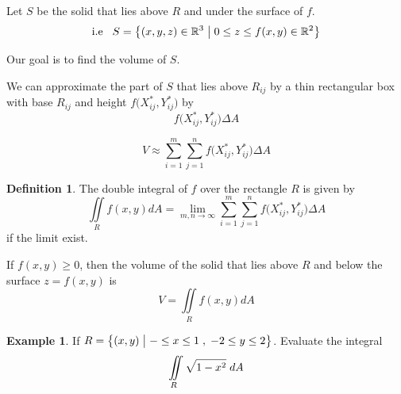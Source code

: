 \documentclass[11pt,a4paper]{article}
\theoremstyle{definition}
\newtheorem{defn}[thm]{Definition}
\newtheorem{exa}[thm]{Example}
\begin{document}
Let $S$ be the solid that lies above $R$ and under the surface of $f$.
$$\text{i.e}\hspace{0.3cm} S = \big\{(x,y,z)\in \mathbb{R}^3\hspace{0.1cm}\big|\hspace{0.1cm} 0\leq z \leq f(x,y) \in \mathbb{R}^2\big\}$$ 

Our goal is to find the volume of $S$.


\begin{figure}[H]
\centering
{}
\end{figure}

We can approximate the part of $S$ that lies above $R_{ij}$ by a thin rectangular box with base $R_{ij}$ and height $f\big(X^*_{ij},Y^*_{ij}\big)$ by $$f\big(X^*_{ij},Y^*_{ij}\big)\Delta A$$

$$V \approx \sum^m_{i=1}\sum^n_{j=1}f\big(X^*_{ij},Y^*_{ij}\big)\Delta A$$


\begin{defn}


The double integral of $f$ over the rectangle $R$ is given by 
$$\iint\limits_R f(x,y)dA = \lim_{m,n\rightarrow \infty}\sum^m_{i=1}\sum^n_{j=1}f\big(X^*_{ij},Y^*_{ij}\big)\Delta A$$ if the limit exist.


If $f(x,y)\geq 0$, then the volume of the solid that lies above $R$ and below the surface $z = f(x,y)$ is $$V = \iint\limits_R f(x,y) dA$$


\end{defn}

\begin{exa}


If $R = \big\{ (x,y)\hspace{0.1cm} \big|\hspace{0.1cm} -\leq x \leq 1 \hspace{0.1cm} , \hspace{0.1cm} -2\leq y\leq 2\big\}$. Evaluate the integral $$\iint\limits_R \sqrt{1 - x^2}\hspace{0.1cm} dA$$
\end{exa}
\end{document}
